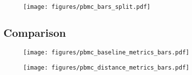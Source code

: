 \begin{figure}[h!]
    \centering
    \texttt{[image: figures/pbmc\_bars\_split.pdf]}
\end{figure}

\clearpage

\subsection{Comparison}

\begin{figure}[h!]
    \centering
    \texttt{[image: figures/pbmc\_baseline\_metrics\_bars.pdf]}
\end{figure}

\begin{figure}[h!]
    \centering
    \texttt{[image: figures/pbmc\_distance\_metrics\_bars.pdf]}
\end{figure}